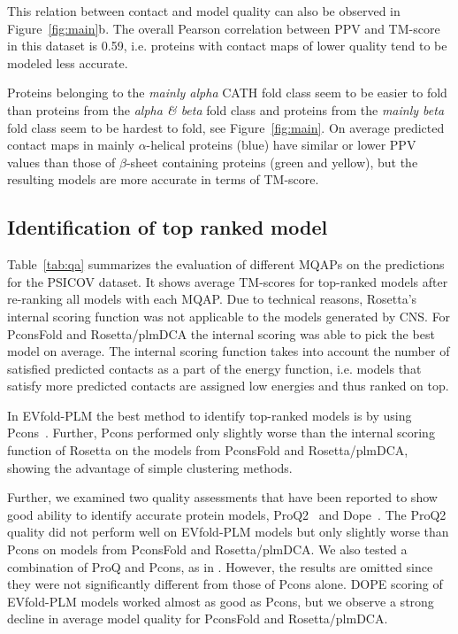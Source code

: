 \documentclass{bioinfo}
\begin{document}
This relation between contact and model quality can also be observed
in Figure~\ref{fig:main}b. The overall Pearson correlation between PPV and TM-score in
this dataset is 0.59, i.e. proteins with contact maps of lower quality tend
to be modeled less accurate. 


Proteins belonging to the {\it mainly alpha} CATH fold class seem to
be easier to fold than proteins from the {\it alpha \& beta} fold
class and proteins from the {\it mainly beta} fold class seem to be
hardest to fold, see Figure~\ref{fig:main}. On average predicted contact maps in
mainly $\alpha$-helical proteins (blue) have similar or lower PPV
values than those of $\beta$-sheet containing proteins (green and
yellow), but the resulting models are more accurate in terms of
TM-score.




\subsection{Identification of top ranked model}
Table~\ref{tab:qa} summarizes the evaluation of different MQAPs on the
predictions for the PSICOV dataset. It shows average TM-scores for
top-ranked models after re-ranking all models with each MQAP.  Due to
technical reasons, Rosetta's internal scoring function was not
applicable to the models generated by CNS.  For PconsFold and
Rosetta/plmDCA the internal scoring was able to pick the best model on
average. The internal scoring function takes into account the number
of satisfied predicted contacts as a part of the energy
function, i.e. models that satisfy more predicted contacts are
assigned low energies and thus ranked on top.

In  EVfold-PLM the best method to identify top-ranked models is by
using Pcons~\cite[]{lundstrom_pcons:_2001}.
Further, Pcons performed only slightly worse than the internal scoring
function of Rosetta on the models from PconsFold and
Rosetta/plmDCA, showing the advantage of simple clustering methods.

Further, we examined two quality assessments that have been reported
to show good ability to identify accurate protein models, ProQ2~\cite[]{ray_improved_2012} and Dope~\cite[]{Shen17075131}.
The ProQ2 quality did not perform well on EVfold-PLM models but only slightly worse than
Pcons on models from PconsFold and Rosetta/plmDCA. We also tested a
combination of ProQ and Pcons, as in \cite{wallner_pcons.net:_2007}. However, the results are omitted
since they were not significantly different from those of Pcons
alone. DOPE scoring of EVfold-PLM models worked almost as good as Pcons,
but we observe a strong decline in average model quality for PconsFold
and Rosetta/plmDCA. 
\end{document}

